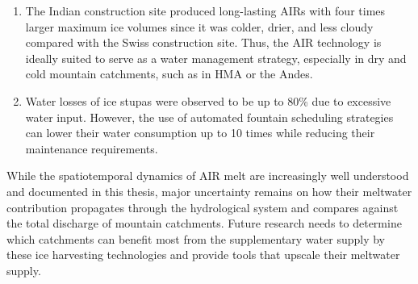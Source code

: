 \begin{enumerate}

  \item The Indian construction site produced long-lasting \ac{AIRs} with four times larger maximum ice volumes
    since it was colder, drier, and less cloudy compared with the Swiss construction site. Thus, the \ac{AIR}
    technology is ideally suited to serve as a water management strategy, especially in dry and cold mountain
    catchments, such as in \ac{HMA} or the Andes.

  \item Water losses of ice stupas were observed to be up to 80\% due to excessive water input. However, the use
    of automated fountain scheduling strategies can lower their water consumption up to 10 times while reducing
    their maintenance requirements.

\end{enumerate}

While the spatiotemporal dynamics of AIR melt are increasingly well understood and documented in this thesis,
major uncertainty remains on how their meltwater contribution propagates through the hydrological system and
compares against the total discharge of mountain catchments. Future research needs to determine which catchments
can benefit most from the supplementary water supply by these ice harvesting technologies and provide tools that
upscale their meltwater supply.

